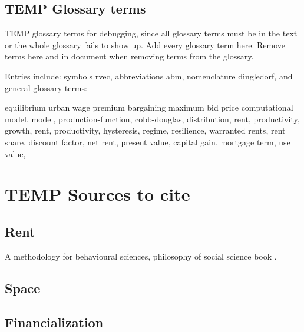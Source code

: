 
\section{TEMP Glossary terms}

TEMP glossary terms for debugging, since all glossary terms must be in the text or the whole glossary fails to show up. Add every glossary term here. Remove terms here and in document when removing terms from the glossary. %

Entries include:  
symbols \gls{rvec}, 
abbreviations \gls{abm}, 
nomenclature \gls{dingledorf}, and general glossary terms:

\gls{equilibrium}
\gls{urban wage premium}
\gls{bargaining}
\gls{maximum bid price}
\gls{computational model}, 
\gls{model},  
\gls{production-function}, 
\gls{cobb-douglas}, 
\gls{distribution},
\gls{rent}, 
\gls{productivity}, 
\gls{growth}, 
\gls{rent}, 
\gls{productivity}, 
\gls{hysteresis}, 
\gls{regime}, 
\gls{resilience}, 
\gls{warranted rents}, 
\gls{rent share},
\gls{discount factor},
\gls{net rent}, 
\gls{present value}, 
\gls{capital gain},
\gls{mortgage term},
\gls{use value},


\chapter{TEMP Sources to cite}

\section{Rent}
A methodology for behavioural sciences, philosophy of social science book \cite{kaplanConductInquiryMethodology2017}.


\section{Space}


\section{Financialization}



